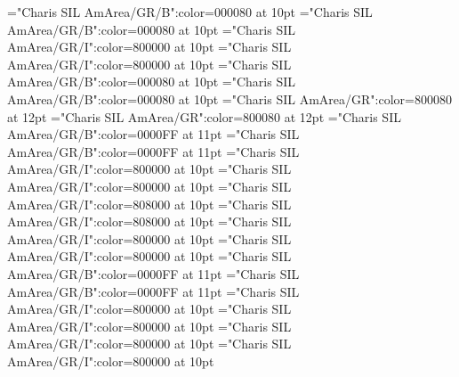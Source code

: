 \documentclass[a4paper,twoside]{article}
\begin{document}
\font\spanmxbheadwordvariantformentrybackrefbvariantformentrybackrefsbmainentrycomplex="Charis SIL AmArea/GR/B":color=000080 at 10pt
\font\spanheadwordvariantformentrybackrefbvariantformentrybackrefsbmainentrycomplex="Charis SIL AmArea/GR/B":color=000080 at 10pt
\font\spanesownertypeabbreviationminimallexreferenceminimallexreferencesmainentrycomplex="Charis SIL AmArea/GR/I":color=800000 at 10pt
\font\spanownertypeabbreviationminimallexreferenceminimallexreferencesmainentrycomplex="Charis SIL AmArea/GR/I":color=800000 at 10pt
\font\spanmxbheadwordconfigtargetconfigtargetsminimallexreferenceminimallexreferencesmainentrycomplex="Charis SIL AmArea/GR/B":color=000080 at 10pt
\font\spanheadwordconfigtargetconfigtargetsminimallexreferenceminimallexreferencesmainentrycomplex="Charis SIL AmArea/GR/B":color=000080 at 10pt
\font\spanesliteralmeaningmainentrycomplex="Charis SIL AmArea/GR":color=800080 at 12pt
\font\spanliteralmeaningmainentrycomplex="Charis SIL AmArea/GR":color=800080 at 12pt
\font\spanmxbheadwordvisiblecomplexformbackrefvisiblecomplexformbackrefsmainentrycomplex="Charis SIL AmArea/GR/B":color=0000FF at 11pt
\font\spanheadwordvisiblecomplexformbackrefvisiblecomplexformbackrefsmainentrycomplex="Charis SIL AmArea/GR/B":color=0000FF at 11pt
\font\spanespartofspeechmorphosyntaxanalysesvisiblecomplexformbackrefsmainentrycomplex="Charis SIL AmArea/GR/I":color=800000 at 10pt
\font\spanpartofspeechmorphosyntaxanalysesvisiblecomplexformbackrefsmainentrycomplex="Charis SIL AmArea/GR/I":color=800000 at 10pt
\font\spanessummaryvisiblecomplexformbackrefsmainentrycomplex="Charis SIL AmArea/GR/I":color=808000 at 10pt
\font\spansummaryvisiblecomplexformbackrefsmainentrycomplex="Charis SIL AmArea/GR/I":color=808000 at 10pt
\font\spanmxbheadwordreferencedentryreferencedentriesvisiblevariantentryrefsmainentrycomplex="Charis SIL AmArea/GR/I":color=800000 at 10pt
\font\spanheadwordreferencedentryreferencedentriesvisiblevariantentryrefsmainentrycomplex="Charis SIL AmArea/GR/I":color=800000 at 10pt
\font\spanmxbheadwordminorentryvariant="Charis SIL AmArea/GR/B":color=0000FF at 11pt
\font\spanheadwordminorentryvariant="Charis SIL AmArea/GR/B":color=0000FF at 11pt
\font\spanesreverseabbrvariantentrytypesvisiblevariantentryrefsminorentryvariant="Charis SIL AmArea/GR/I":color=800000 at 10pt
\font\spanreverseabbrvariantentrytypesvisiblevariantentryrefsminorentryvariant="Charis SIL AmArea/GR/I":color=800000 at 10pt
\font\spanmxbheadwordreferencedentryreferencedentriesvisiblevariantentryrefsminorentryvariant="Charis SIL AmArea/GR/I":color=800000 at 10pt
\font\spanheadwordreferencedentryreferencedentriesvisiblevariantentryrefsminorentryvariant="Charis SIL AmArea/GR/I":color=800000 at 10pt
\end{document}
